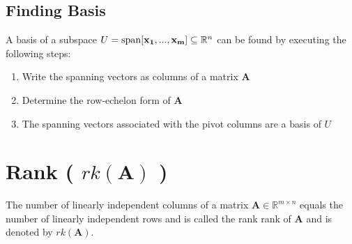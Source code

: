 \subsection{Finding Basis \cite{mfml-1}}
A basis of a subspace $U = \operatorname{span}[\mathbf{x_1, ..., x_m}] \subseteq \mathbb{R}^n$ can be found by executing the following steps:
\begin{enumerate}
    \item Write the spanning vectors as columns of a matrix $\mathbf{A}$
    \item Determine the row-echelon form of $\mathbf{A}$
    \item The spanning vectors associated with the pivot columns are a basis of $U$
\end{enumerate}


\section{Rank ( $rk(\mathbf{A})$ ) \cite{mfml-1}}\label{matrix: Rank}

The number of linearly independent columns of a matrix $\mathbf{A} \in \mathbb{R}^{m \times n}$ equals the number of linearly independent rows and is called the rank rank of $\mathbf{A}$ and is denoted by $rk(\mathbf{A})$.

